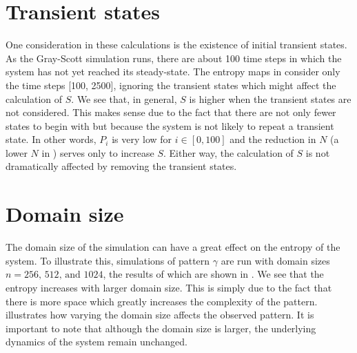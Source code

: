 \section{Transient states}

One consideration in these calculations is the existence of initial transient states. As the Gray-Scott simulation runs, there are about 100 time steps in which the system has not yet reached its steady-state. The entropy maps in  consider only the time steps [100, 2500], ignoring the transient states which might affect the calculation of $S$. We see that, in general, $S$ is higher when the transient states are not considered. This makes sense due to the fact that there are not only fewer states to begin with but because the system is not likely to repeat a transient state. In other words, $P_i$ is very low for $i \in [0, 100]$ and the reduction in $N$ (a lower $N$ in ) serves only to increase $S$. Either way, the calculation of $S$ is not dramatically affected by removing the transient states.

\section{Domain size}

The domain size of the simulation can have a great effect on the entropy of the system. To illustrate this, simulations of pattern $\gamma$ are run with domain sizes $n = 256,\, 512,\, \text{and } 1024$, the results of which are shown in . We see that the entropy increases with larger domain size. This is simply due to the fact that there is more space which greatly increases the complexity of the pattern.  illustrates how varying the domain size affects the observed pattern. It is important to note that although the domain size is larger, the underlying dynamics of the system remain unchanged.

